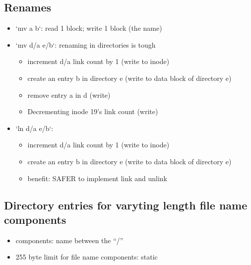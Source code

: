 \documentclass[11pt]{article}
\begin{document}
\subsection{Renames}
\label{sec:org17e9a6f}
\begin{itemize}
\item `mv a b`: read 1 block; write 1 block (the name)
\item `mv d/a e/b`: renaming in directories is tough
\begin{itemize}
\item increment d/a link count by 1 (write to inode)
\item create an entry b in directory e (write to data block of directory e)
\item remove entry a in d (write)
\item Decrementing inode 19's link count (write)
\end{itemize}
\item `ln d/a e/b`:
\begin{itemize}
\item increment d/a link count by 1 (write to inode)
\item create an entry b in directory e (write to data block of directory e)
\item benefit: SAFER to implement link and unlink
\end{itemize}
\end{itemize}
\subsection{Directory entries for varyting length file name components}
\label{sec:org1a712ba}
\begin{itemize}
\item components: name between the ``/''
\item 255 byte limit for file name components: static
\end{itemize}
\end{document}
